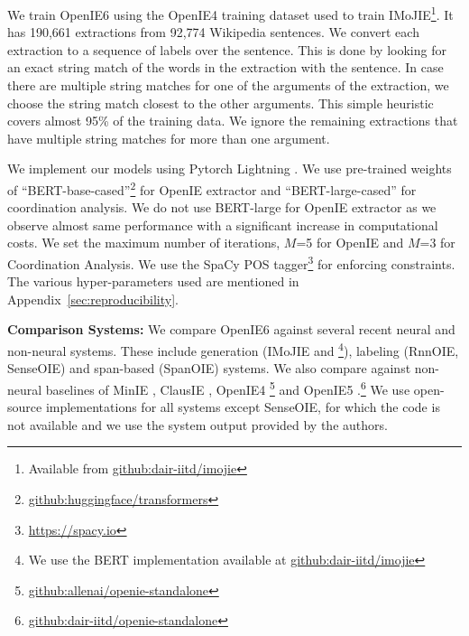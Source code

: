 \documentclass[11pt,a4paper]{article}
\makeatletter
\newcommand\footnoteref[1]{\protected@xdef\@thefnmark{\ref{#1}}\@footnotemark}
\makeatother
\begin{document}
We train OpenIE6 using the OpenIE4 training dataset used to train IMoJIE\footnote{Available from \href{https://github.com/dair-iitd/imojie}{github:dair-iitd/imojie}}. It has 190,661 extractions from 92,774 Wikipedia sentences.
We convert each extraction to a sequence of labels over the sentence. This is done by looking for an exact string match of the words in the extraction with the sentence. In case there are multiple string matches for one of the arguments of the extraction, we choose the string match closest to the other arguments. This simple heuristic covers almost 95\% of the training data. We ignore the remaining extractions that have multiple string matches for more than one argument.

We implement our models using Pytorch Lightning \cite{falcon&19}. We 
use pre-trained weights of ``BERT-base-cased''\footnote{\label{footnote:huggingface}\href{https://github.com/huggingface/transformers}{github:huggingface/transformers}} for OpenIE extractor and ``BERT-large-cased''\footnoteref{footnote:huggingface} for coordination analysis.
We do not use BERT-large for OpenIE extractor as we observe almost same performance with a significant increase in computational costs.
We set the maximum number of iterations, $M$=5 for OpenIE and $M$=3 for Coordination Analysis. We use the SpaCy POS tagger\footnote{\href{https://spacy.io}{https://spacy.io}} for enforcing constraints. The various hyper-parameters used are mentioned in Appendix~\ref{sec:reproducibility}.













\vspace{0.5ex}
\noindent
{\bf Comparison Systems:}  We compare OpenIE6 against several recent neural and non-neural systems. These include generation (IMoJIE and \citet{cui+18}\footnote{We use the BERT implementation available at \href{https://github.com/dair-iitd/imojie}{github:dair-iitd/imojie}}), labeling (RnnOIE, SenseOIE) and span-based (SpanOIE) systems.
We also compare against non-neural baselines of MinIE \cite{gashteovski&al17},
ClausIE \cite{corro&al13},
OpenIE4 \cite{christensen&al11}\footnote{\href{https://github.com/allenai/openie-standalone}{github:allenai/openie-standalone}} and OpenIE5 \cite{saha&al2017, saha&mausam18}.\footnote{\href{https://github.com/dair-iitd/OpenIE-standalone}{github:dair-iitd/openie-standalone}}  We use open-source implementations for all systems except SenseOIE, for which the code is not available and we use the system output provided by the authors.
\end{document}
